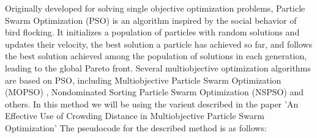 \newpage
{}
Originally developed for solving single objective optimization problems, Particle Swarm Optimization (PSO) \cite{shi2004particle} is an algorithm inspired by the social behavior of bird flocking. It initializes a population of particles with random solutions and updates their velocity, the best solution a particle has achieved so far, and follows the best solution achieved among the population of solutions in each generation, leading to the global Pareto front. Several multiobjective optimization algorithms are based on PSO, including Multiobjective Particle Swarm Optimization (MOPSO) \cite{coello2004handling}, Nondominated Sorting Particle Swarm Optimization (NSPSO) \cite{li2003non} and others. In this method we will be using the varient described in the paper 'An Effective Use of Crowding Distance in Multiobjective Particle Swarm Optimization' \cite{raquel2005effective} \newline The pseudocode for the described method is as follows:
